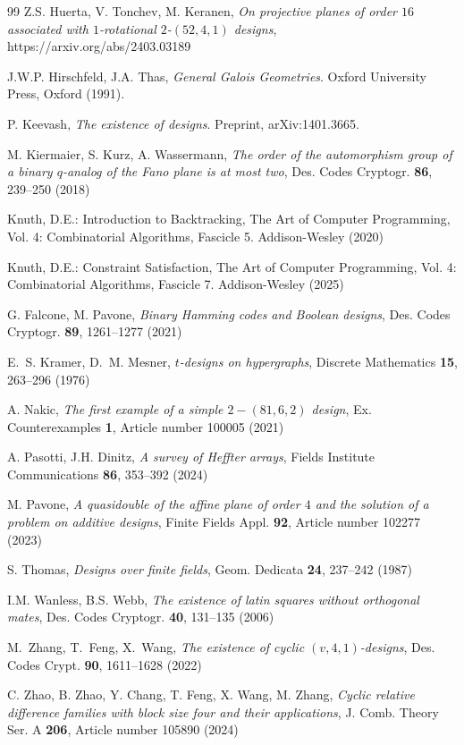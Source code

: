 \documentclass[a4paper, 11pt]{article}
\theoremstyle{definition}
\theoremstyle{definition}
\theoremstyle{definition}
\numberwithin{equation}{section}
\begin{document}
\begin{thebibliography}{99}
 Z.S. Huerta, V. Tonchev, M. Keranen,
{\it On projective planes of order $16$ associated with $1$-rotational $2$-$(52, 4, 1)$ designs},
https://arxiv.org/abs/2403.03189


 J.W.P. Hirschfeld, J.A. Thas, {\it General Galois Geometries}. Oxford University Press, Oxford (1991).

 P. Keevash, {\it The existence of designs}. Preprint,
arXiv:1401.3665.

M. Kiermaier, S. Kurz, A. Wassermann, {\it The order of the automorphism group of a binary $q$-analog of the Fano plane is at most two},
Des. Codes Cryptogr. {\bf86}, 239--250 (2018)

Knuth, D.E.: Introduction to Backtracking, The Art of Computer Programming, Vol. 4: Combinatorial Algorithms,
Fascicle 5. Addison-Wesley (2020)

Knuth, D.E.: Constraint Satisfaction, The Art of Computer Programming, Vol. 4: Combinatorial Algorithms,
Fascicle 7. Addison-Wesley (2025)

G. Falcone, M. Pavone, {\it Binary Hamming codes and Boolean designs}, Des. Codes Cryptogr. \textbf{89}, 1261--1277 (2021)

E.~S. Kramer, D.~M. Mesner, {\it $t$-designs on hypergraphs}, Discrete Mathematics {\bf15}, 263--296 (1976)

A. Nakic, {\it The first example of a simple $2-(81,6,2)$ design}, Ex. Counterexamples {\bf1}, Article number 100005 (2021)

  A. Pasotti, J.H. Dinitz,
{\it A survey of Heffter arrays},
Fields Institute Communications {\bf86}, 353--392 (2024)

M. Pavone, {\it A quasidouble of the affine plane of order $4$ and the solution of a problem on additive designs},
Finite Fields Appl. {\bf92}, Article number 102277 (2023) 

S. Thomas, {\it Designs over finite fields}, Geom. Dedicata {\bf24}, 237--242 (1987)

I.M. Wanless, B.S. Webb, {\it The existence of latin squares without orthogonal mates},
Des. Codes Cryptogr. {\bf40},  131--135 (2006)

M.~Zhang, T.~Feng, X.~Wang, {\it The existence of cyclic $(v, 4, 1)$-designs}, Des. Codes Crypt. {\bf 90}, 1611--1628 (2022)

C. Zhao, B. Zhao, Y. Chang, T. Feng, X. Wang, M. Zhang,
{\it Cyclic relative difference families with block size four and their applications}, 
J. Comb. Theory Ser. A {\bf206},  Article number 105890 (2024)


\end{thebibliography}
\end{document}
